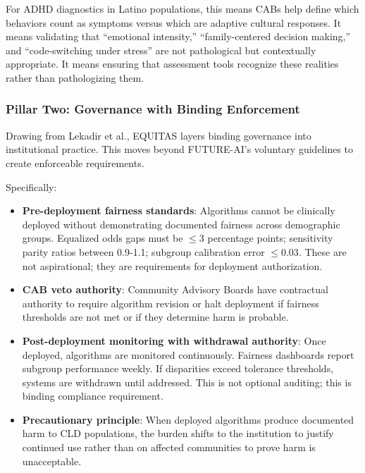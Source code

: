 \documentclass[12pt,a4paper]{article}
\begin{document}
For ADHD diagnostics in Latino populations, this means CABs help define which behaviors count as symptoms versus which are adaptive cultural responses. It means validating that ``emotional intensity,'' ``family-centered decision making,'' and ``code-switching under stress'' are not pathological but contextually appropriate. It means ensuring that assessment tools recognize these realities rather than pathologizing them.

\subsubsection{Pillar Two: Governance with Binding Enforcement}

Drawing from Lekadir et al., EQUITAS layers binding governance into institutional practice. This moves beyond FUTURE-AI's voluntary guidelines to create enforceable requirements.

Specifically:

\begin{itemize}
\item \textbf{Pre-deployment fairness standards}: Algorithms cannot be clinically deployed without demonstrating documented fairness across demographic groups. Equalized odds gaps must be $\leq 3$ percentage points; sensitivity parity ratios between 0.9-1.1; subgroup calibration error $\leq 0.03$. These are not aspirational; they are requirements for deployment authorization.

\item \textbf{CAB veto authority}: Community Advisory Boards have contractual authority to require algorithm revision or halt deployment if fairness thresholds are not met or if they determine harm is probable.

\item \textbf{Post-deployment monitoring with withdrawal authority}: Once deployed, algorithms are monitored continuously. Fairness dashboards report subgroup performance weekly. If disparities exceed tolerance thresholds, systems are withdrawn until addressed. This is not optional auditing; this is binding compliance requirement.

\item \textbf{Precautionary principle}: When deployed algorithms produce documented harm to CLD populations, the burden shifts to the institution to justify continued use rather than on affected communities to prove harm is unacceptable.
\end{itemize}
\end{document}
